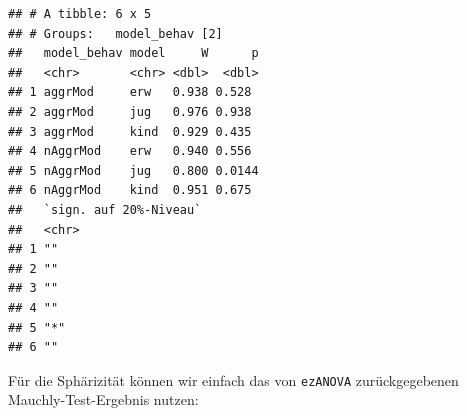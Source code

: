 \documentclass[
]{book}
\newenvironment{Shaded}{\begin{snugshade}}{\end{snugshade}}
\newcommand{\AttributeTok}[1]{\textcolor[rgb]{0.77,0.63,0.00}{#1}}
\newcommand{\NormalTok}[1]{#1}
\newcommand{\SpecialCharTok}[1]{\textcolor[rgb]{0.00,0.00,0.00}{#1}}
\newcommand{\StringTok}[1]{\textcolor[rgb]{0.31,0.60,0.02}{#1}}
\begin{document}
\begin{verbatim}
## # A tibble: 6 x 5
## # Groups:   model_behav [2]
##   model_behav model     W      p
##   <chr>       <chr> <dbl>  <dbl>
## 1 aggrMod     erw   0.938 0.528 
## 2 aggrMod     jug   0.976 0.938 
## 3 aggrMod     kind  0.929 0.435 
## 4 nAggrMod    erw   0.940 0.556 
## 5 nAggrMod    jug   0.800 0.0144
## 6 nAggrMod    kind  0.951 0.675 
##   `sign. auf 20%-Niveau`
##   <chr>                 
## 1 ""                    
## 2 ""                    
## 3 ""                    
## 4 ""                    
## 5 "*"                   
## 6 ""
\end{verbatim}

Für die Sphärizität können wir einfach das von \texttt{ezANOVA} zurückgegebenen Mauchly-Test-Ergebnis nutzen:

\begin{Shaded}
\end{Shaded}

 
  \providecommand{\huxb}[2]{\arrayrulecolor[RGB]{#1}\global\arrayrulewidth=#2pt}
  \providecommand{\huxvb}[2]{\color[RGB]{#1}\vrule width #2pt}
  \providecommand{\huxtpad}[1]{\rule{0pt}{#1}}
  \providecommand{\huxbpad}[1]{\rule[-#1]{0pt}{#1}}
\end{document}
